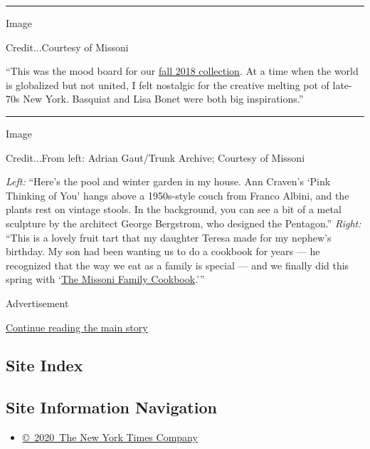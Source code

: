 \begin{center}\rule{0.5\linewidth}{\linethickness}\end{center}

Image

Credit...Courtesy of Missoni

``This was the mood board for our
\href{https://www.nytimes.com/slideshow/2018/02/24/fashion/runway-womens/missoni-m-w-fall-2018.html}{fall
2018 collection}. At a time when the world is globalized but not united,
I felt nostalgic for the creative melting pot of late-70s New York.
Basquiat and Lisa Bonet were both big inspirations.''

\begin{center}\rule{0.5\linewidth}{\linethickness}\end{center}

Image

Credit...From left: Adrian Gaut/Trunk Archive; Courtesy of Missoni

\emph{Left:} ``Here's the pool and winter garden in my house. Ann
Craven's `Pink Thinking of You' hangs above a 1950s-style couch from
Franco Albini, and the plants rest on vintage stools. In the background,
you can see a bit of a metal sculpture by the architect George
Bergstrom, who designed the Pentagon.'' \emph{Right:} ``This is a lovely
fruit tart that my daughter Teresa made for my nephew's birthday. My son
had been wanting us to do a cookbook for years --- he recognized that
the way we eat as a family is special --- and we finally did this spring
with
`\href{https://www.nytimes.com/2018/04/23/dining/missoni-family-cookbook.html}{The
Missoni Family Cookbook}.'''

Advertisement

\protect\hyperlink{after-bottom}{Continue reading the main story}

\hypertarget{site-index}{%
\subsection{Site Index}\label{site-index}}

\hypertarget{site-information-navigation}{%
\subsection{Site Information
Navigation}\label{site-information-navigation}}

\begin{itemize}
\tightlist
\item
  \href{https://help.nytimes.com/hc/en-us/articles/115014792127-Copyright-notice}{©~2020~The
  New York Times Company}
\end{itemize}

